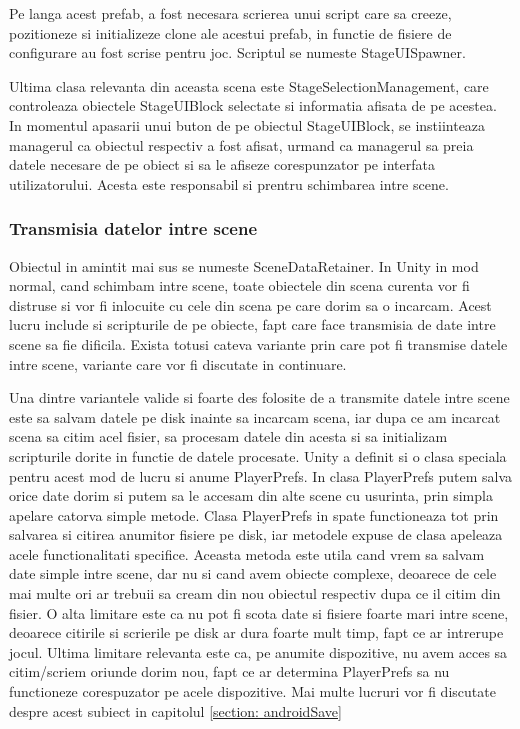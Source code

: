\documentclass[12pt, a4paper]{article}
\begin{document}
	Pe langa acest prefab, a fost necesara scrierea unui script care sa creeze, pozitioneze si initializeze clone ale acestui prefab, in functie de fisiere de configurare au fost scrise pentru joc. Scriptul se numeste StageUISpawner.
	\newline
	
	Ultima clasa relevanta din aceasta scena este StageSelectionManagement, care controleaza obiectele StageUIBlock selectate si informatia afisata de pe acestea. In momentul apasarii unui buton de pe obiectul StageUIBlock, se instiinteaza managerul ca obiectul respectiv a fost afisat, urmand ca managerul sa preia datele necesare de pe obiect si sa le afiseze corespunzator pe interfata utilizatorului. Acesta este responsabil si prentru schimbarea intre scene.
	
	
	
	
	
	\subsubsection{Transmisia datelor intre scene}
	\label{section: dataBetweenScenes}
	
	Obiectul in amintit mai sus se numeste SceneDataRetainer. In Unity in mod normal, cand schimbam intre scene, toate obiectele din scena curenta vor fi distruse si vor fi inlocuite cu cele din scena pe care dorim sa o incarcam. Acest lucru include si scripturile de pe obiecte, fapt care face transmisia de date intre scene sa fie dificila. Exista totusi cateva variante prin care pot fi transmise datele intre scene, variante care vor fi discutate in continuare.
	\newline
	
	Una dintre variantele valide si foarte des folosite de a transmite datele intre scene este sa salvam datele pe disk inainte sa incarcam scena, iar dupa ce am incarcat scena sa citim acel fisier, sa procesam datele din acesta si sa initializam scripturile dorite in functie de datele procesate. Unity a definit si o clasa speciala pentru acest mod de lucru si anume PlayerPrefs. In clasa PlayerPrefs putem salva orice date dorim si putem sa le accesam din alte scene cu usurinta, prin simpla apelare catorva simple metode. Clasa PlayerPrefs in spate functioneaza tot prin salvarea si citirea anumitor fisiere pe disk, iar metodele expuse de clasa apeleaza acele functionalitati specifice. Aceasta metoda este utila cand vrem sa salvam date simple intre scene, dar nu si cand avem obiecte complexe, deoarece de cele mai multe ori ar trebuii sa cream din nou obiectul respectiv dupa ce il citim din fisier. O alta limitare este ca nu pot fi scota date si fisiere foarte mari intre scene, deoarece citirile si scrierile pe disk ar dura foarte mult timp, fapt ce ar intrerupe jocul. Ultima limitare relevanta este ca, pe anumite dispozitive, nu avem acces sa citim/scriem oriunde dorim nou, fapt ce ar determina PlayerPrefs sa nu functioneze corespuzator pe acele dispozitive. Mai multe lucruri vor fi discutate despre acest subiect in capitolul \ref{section: androidSave}
	\newline
	
\end{document}
